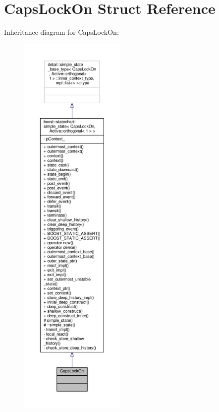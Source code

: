 \hypertarget{struct_caps_lock_on}{}\section{Caps\+Lock\+On Struct Reference}
\label{struct_caps_lock_on}


Inheritance diagram for Caps\+Lock\+On\+:
\nopagebreak
\begin{figure}[H]
\begin{center}
\leavevmode
\includegraphics[height=550pt]{struct_caps_lock_on__inherit__graph}
\end{center}
\end{figure}


